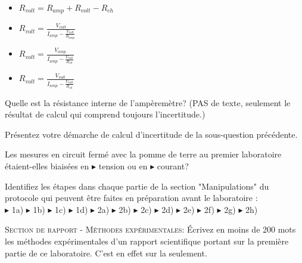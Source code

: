 \documentclass[canadien,12pt,oneside,letterpaper]{article}
\begin{document}
\begin{gradescope}
\begin{gradescope}
\begin{itemize}[label=$\blacktriangleright$]
    \item $R_{volt}=R_{amp}+R_{volt}-R_{ch}$
    \item $R_{volt} = \frac{V_{volt}}{I_{amp}-\frac{V_{volt}}{R_{amp}}}$
    \item $R_{volt} = \frac{V_{amp}}{I_{amp}-\frac{V_{volt}}{R_{ch}}}$
    \item $R_{volt} = \frac{V_{volt}}{I_{amp}-\frac{V_{volt}}{R_{ch}}}$
    \end{itemize}
    \item Quelle est la résistance interne de l'ampèremètre? (PAS de texte, seulement le résultat de calcul qui comprend toujours l'incertitude.)
    \item Présentez votre démarche de calcul d'incertitude de la sous-question précédente. %
    \end{gradescope}
\item Les mesures en circuit fermé avec la pomme de terre au premier laboratoire étaient-elles biaisées en $\blacktriangleright$ tension ou en $\blacktriangleright$ courant?
\item Identifiez les étapes dans chaque partie de la section "Manipulations" du protocole qui peuvent être faites en préparation avant le laboratoire :\\ $\blacktriangleright$ 1a) $\blacktriangleright$ 1b) $\blacktriangleright$ 1c) $\blacktriangleright$ 1d) $\blacktriangleright$ 2a) $\blacktriangleright$ 2b) $\blacktriangleright$ 2c) $\blacktriangleright$ 2d) $\blacktriangleright$ 2e) $\blacktriangleright$ 2f) $\blacktriangleright$ 2g) $\blacktriangleright$ 2h) 
\item \textsc{Section de rapport - Méthodes expérimentales:} Écrivez en moins de 200 mots les méthodes expérimentales d'un rapport scientifique portant sur la première partie de ce laboratoire. C'est en effet sur la  seulement.
\end{gradescope}
\end{document}
